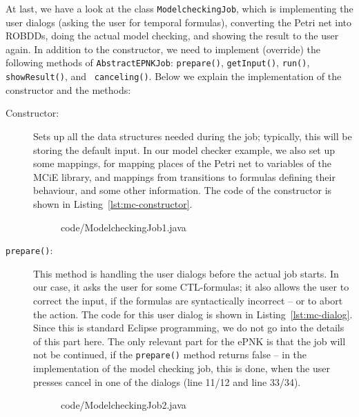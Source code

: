 At last, we have a look at the class {\tt ModelcheckingJob}, which
is implementing the user dialogs (asking the user for temporal formulas),
converting the Petri net into ROBDDs, doing the actual model checking,
and showing the result to the user again. In addition to the constructor,
we need to implement (override) the following methods of
{\tt AbstractEPNKJob}:%
{\tt prepare()}, {\tt getInput()}, {\tt run()}, {\tt showResult()}, and {\tt
canceling()}. Below we explain the implementation of the constructor and the
methods:
\begin{description}
\item[Constructor:] Sets up all the data structures needed during the job;
    typically, this will be storing the default input. In our model checker
    example, we also set up some mappings, for mapping places of the
    Petri net to variables of the MCiE library, and mappings from transitions    
    to formulas defining their behaviour, and some other information.
    The code of the constructor is shown in Listing~\ref{lst:mc-constructor}.
\begin{figure}[tbp!] %
%
{code/ModelcheckingJob1.java}
\end{figure}

\item[{\tt prepare()}:] This method is handling the user dialogs before the
    actual job starts. In our case, it asks the user for some CTL-formulas;
    it also allows the user to correct the input, if the formulas are
    syntactically incorrect -- or to abort the action. The code for this
    user dialog is shown in Listing~\ref{lst:mc-dialog}. Since this is
    standard Eclipse programming, we do not go into the details of
    this part here. The only relevant part for the ePNK is that the
    job will not be continued, if the {\tt prepare()} method returns false --
    in the implementation of the model checking job, this is done, when
    the user presses cancel in one of the dialogs (line 11/12 and line 33/34).
  
\begin{figure}[htbp!]
%
{code/ModelcheckingJob2.java}
\end{figure}    


\end{description}
